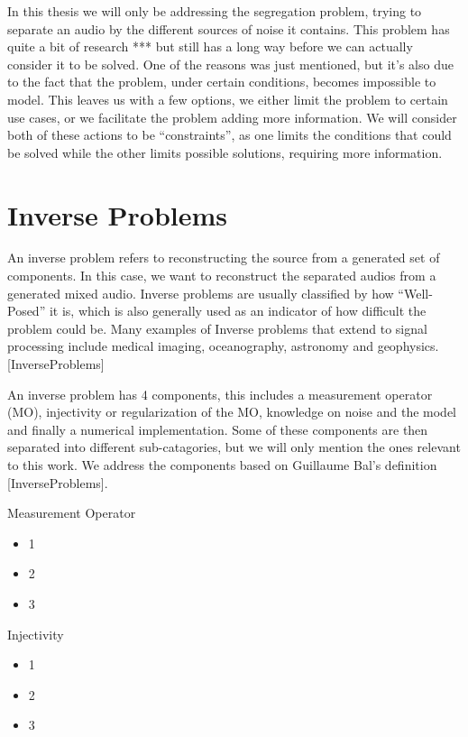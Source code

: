 \documentclass{book}
\begin{document}
\par
In this thesis we will only be addressing the segregation problem, trying to separate an audio by the different sources of noise it contains. This problem has quite a bit of research *** but still has a long way before we can actually consider it to be solved. One of the reasons was just mentioned, but it’s also due to the fact that the problem, under certain conditions, becomes impossible to model. This leaves us with a few options, we either limit the problem to certain use cases, or we facilitate the problem adding more information. We will consider both of these actions to be “constraints”, as one limits the conditions that could be solved while the other limits possible solutions, requiring more information.

\section{Inverse Problems}
\qquad An inverse problem refers to reconstructing the source from a generated set of components. In this case, we want to reconstruct the separated audios from a generated mixed audio. Inverse problems are usually classified by how “Well-Posed” it is, which is also generally used as an indicator of how difficult the problem could be. Many examples of Inverse problems that extend to signal processing include medical imaging, oceanography, astronomy and geophysics. [InverseProblems]
\par
An inverse problem has 4 components, this includes a measurement operator (MO), injectivity or regularization of the MO, knowledge on noise and the model and finally a numerical implementation. Some of these components are then separated into different sub-catagories, but we will only mention the ones relevant to this work. We address the components based on Guillaume Bal’s definition [InverseProblems].

\begin{center}
\noindent Measurement Operator
\end{center}
\begin{itemize}
    \item 1
    \item 2
    \item 3
\end{itemize}

\begin{center}
\noindent Injectivity
\end{center}
\begin{itemize}
    \item 1
    \item 2
    \item 3
\end{itemize}
\end{document}
